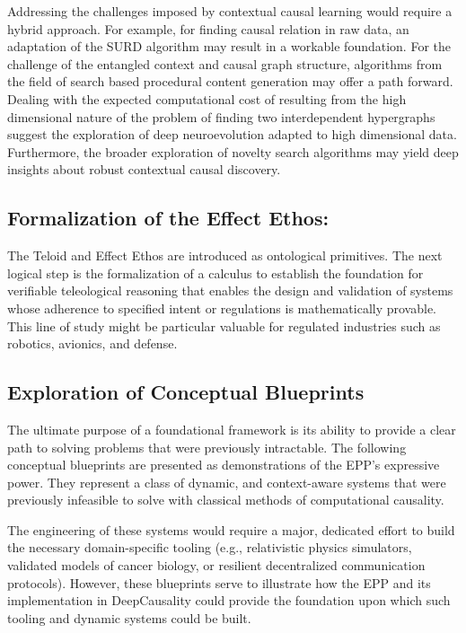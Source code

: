 Addressing the challenges imposed by contextual causal learning would require a hybrid approach. For example, for finding causal relation in raw data, an adaptation of the SURD algorithm\cite{martinez2024decomposing} may result in a workable foundation. For the challenge of the entangled context and causal graph structure, algorithms from the field of search based procedural content generation\cite{togelius2011search} may offer a path forward. Dealing with the expected computational cost of resulting from the high dimensional nature of the problem of finding two interdependent hypergraphs suggest the exploration of deep neuro\-evolution adapted to high dimensional data\cite{colas2020scaling}. Furthermore, the broader exploration of novelty search\cite{lehman2011abandoning} algorithms may yield deep insights about robust contextual causal discovery. 

\subsection{Formalization of the Effect Ethos:} 

The Teloid and Effect Ethos are introduced as ontological primitives. The next logical step is the formalization of a calculus to establish the foundation for verifiable teleological reasoning that enables the design and validation of systems whose adherence to specified intent or regulations is mathematically provable. This line of study might be particular valuable for regulated industries such as robotics, avionics, and defense. 

\subsection{Exploration of Conceptual Blueprints}


The ultimate purpose of a foundational framework is its ability to provide a clear path to solving problems that were previously intractable. The following conceptual blueprints are presented as demonstrations of the EPP's expressive power. They represent a class of dynamic, and context-aware systems that were previously infeasible to solve with classical methods of computational causality.

The engineering of these systems would require a major, dedicated effort to build the necessary domain-specific tooling (e.g., relativistic physics simulators, validated models of cancer biology, or resilient decentralized communication protocols). However, these blueprints serve to illustrate how the EPP and its implementation in DeepCausality could provide the foundation upon which such tooling and dynamic systems could be built. 

\newpage